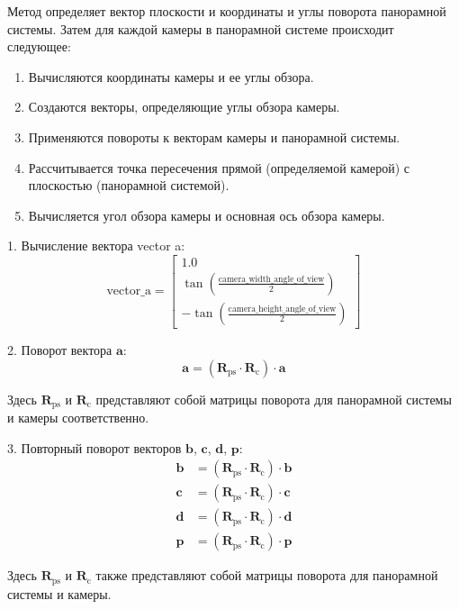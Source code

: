 Метод определяет вектор плоскости и координаты и углы поворота панорамной системы. Затем для каждой камеры в панорамной системе происходит следующее:

    \begin{enumerate}
        \item Вычисляются координаты камеры и ее углы обзора.
        \item Создаются векторы, определяющие углы обзора камеры.
        \item Применяются повороты к векторам камеры и панорамной системы.
        \item Рассчитывается точка пересечения прямой (определяемой камерой) с плоскостью (панорамной системой).
        \item Вычисляется угол обзора камеры и основная ось обзора камеры.
    \end{enumerate}


1. Вычисление вектора vector a:
$$
\text{vector\_a} = \begin{bmatrix}
1.0 \\
\tan\left(\frac{\text{camera\_width\_angle\_of\_view}}{2}\right) \\
-\tan\left(\frac{\text{camera\_height\_angle\_of\_view}}{2}\right)
\end{bmatrix}
$$

2. Поворот вектора $ \mathbf{a} $:
$$
\mathbf{a} = \left(\mathbf{R}_\text{ps} \cdot \mathbf{R}_\text{c}\right) \cdot \mathbf{a}
$$

Здесь $ \mathbf{R}_\text{ps} $ и $ \mathbf{R}_\text{c} $ представляют собой матрицы поворота для панорамной системы и камеры соответственно.

3. Повторный поворот векторов $ \mathbf{b} $, $ \mathbf{c} $, $ \mathbf{d} $, $ \mathbf{p} $:
\begin{align*}
\mathbf{b} &= \left(\mathbf{R}_\text{ps} \cdot \mathbf{R}_\text{c}\right) \cdot \mathbf{b} \\
\mathbf{c} &= \left(\mathbf{R}_\text{ps} \cdot \mathbf{R}_\text{c}\right) \cdot \mathbf{c} \\
\mathbf{d} &= \left(\mathbf{R}_\text{ps} \cdot \mathbf{R}_\text{c}\right) \cdot \mathbf{d} \\
\mathbf{p} &= \left(\mathbf{R}_\text{ps} \cdot \mathbf{R}_\text{c}\right) \cdot \mathbf{p} 
\end{align*}

Здесь $ \mathbf{R}_\text{ps} $ и $ \mathbf{R}_\text{c} $ также представляют собой матрицы поворота для панорамной системы и камеры.

